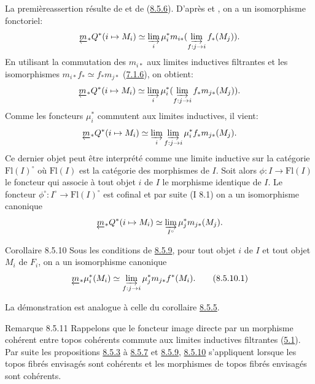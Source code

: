 \documentclass[10pt]{../fichiers-configuration-latex/smfart}
\begin{document}
La première\pageoriginale assertion résulte de  et de (\hyperref[VI.cor8.5.6]{8.5.6}). D'après
 et , on a un isomorphisme fonctoriel:
$$
\underleftarrow{m}_{\ast} Q^{\ast} (i \mapsto M_i) \simeq
\varinjlim_i \mu^{\ast}_{i} m_{i\ast} (\varinjlim_{f
  : j \to i} f_{\ast} (M_{j})){\quoi}.
$$
En utilisant la commutation des $m_{i\ast}$ aux limites inductives
filtrantes et les isomorphismes $m_{i\ast} f_{\ast} \simeq f_{\ast}
m_{j\ast}$ (\hyperref[VI.subsubsec7.1.6]{7.1.6}), on obtient:
$$
\underleftarrow{m}_{\ast} Q^{\ast} (i \mapsto M_i) \simeq
\varinjlim_i \mu^{\ast}_{i} (\varinjlim_{f : j \to
  i} f_{\ast} m_{j\ast} (M_j)){\quoi}.
$$
Comme les foncteurs $\mu^{\ast}_{i}$ commutent aux limites inductives,
il vient:
$$
\underleftarrow{m}_{\ast}Q^{\ast}(i\mapsto M_{i})\simeq \varinjlim_{i}
\varinjlim_{f:j\to i} \mu^{\ast}_{i}f_{\ast}m_{j\ast}(M_{j}){\quoi}.
$$
Ce dernier objet peut être interprété comme une limite inductive sur
la catégorie $\text{Fl}(I)^{\circ}$ où $\text{Fl}(I)$ est la catégorie des
morphismes de $I$. Soit alors $\phi : I \to \text{Fl}(I)$ le foncteur qui associe à
tout objet $i$ de $I$ le morphisme identique de $I$. Le foncteur
$\phi^{\circ}
: I^{\circ} \to \text{Fl}(I)^{\circ}$ est cofinal et par suite
(I 8.1) on a un isomorphisme canonique
$$
\underleftarrow{m}_{\ast} Q^{\ast} (i \mapsto M_i) \simeq
\varinjlim_{I^{\circ}} \mu^{\ast}_{j} m_{j\ast}(M_j){}.
$$

\begin{enonce*}{Corollaire 8.5.10}
Sous les conditions de \hyperref[VI.prop8.5.9]{8.5.9}, pour tout objet $i$ de $I$ et tout objet
$M_i$ de $F_i$, on a un isomorphisme canonique
\begin{equation*}
\underleftarrow{m}_{\ast} \mu^{\ast}_i (M_i) \simeq
\varinjlim_{f:j\to i} \mu^{\ast}_{j} m_{j\ast}f^{\ast}
(M_{i}){\quoi}.\tag{8.5.10.1}
\end{equation*}
\end{enonce*}

La démonstration est analogue à celle du corollaire \hyperref[VI.cor8.5.5]{8.5.5}.

\begin{enonce*}[remark]{Remarque 8.5.11}
Rappelons que le foncteur image directe par un morphisme cohérent
entre topos cohérents commute aux limites inductives filtrantes
(\hyperref[VI.thm5.1]{5.1}). Par suite les propositions \hyperref[VI.prop8.5.3]{8.5.3} à \hyperref[VI.cor8.5.7]{8.5.7} et
\hyperref[VI.prop8.5.9]{8.5.9}, \hyperref[VI.cor8.5.10]{8.5.10}
s'appliquent lorsque les topos fibrés envisagés sont cohérents et les
morphismes de topos fibrés envisagés sont cohérents.
\end{enonce*}
\end{document}
